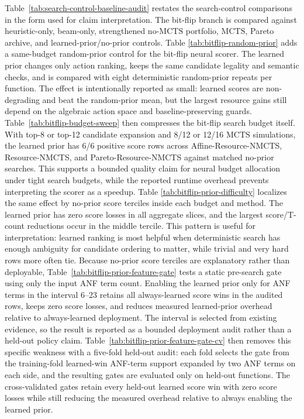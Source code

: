 \documentclass[11pt]{article}
\newcommand{\method}{Resource-NMCTS}
\newcommand{\mcts}{\ensuremath{\mathrm{MCTS}}}
\begin{document}
Table~\ref{tab:search-control-baseline-audit} restates the search-control
comparisons in the form used for claim interpretation.  The bit-flip branch is
compared against heuristic-only, beam-only, strengthened no-\mcts{} portfolio,
\mcts{}, Pareto archive, and learned-prior/no-prior controls.  Table
\ref{tab:bitflip-random-prior} adds a same-budget random-prior control for the
bit-flip neural scorer.  The learned prior changes only action ranking, keeps
the same candidate legality and semantic checks, and is compared with eight
deterministic random-prior repeats per function.  The effect is intentionally
reported as small: learned scores are non-degrading and beat the random-prior
mean, but the largest resource gains still depend on the algebraic action space
and baseline-preserving guards.  Table~\ref{tab:bitflip-budget-sweep} then
compresses the bit-flip search budget itself.  With top-8 or top-12 candidate
expansion and 8/12 or 12/16 \mcts{} simulations, the learned prior has 6/6
positive score rows across Affine-\method{}, \method{}, and Pareto-\method{}
against matched no-prior searches.  This supports a bounded quality claim for
neural budget allocation under tight search budgets, while the reported runtime
overhead prevents interpreting the scorer as a speedup.  Table
\ref{tab:bitflip-prior-difficulty} localizes the same effect by no-prior score
terciles inside each budget and method.  The learned prior has zero score
losses in all aggregate slices, and the largest score/T-count reductions occur
in the middle tercile.  This pattern is useful for interpretation: learned
ranking is most helpful when deterministic search has enough ambiguity for
candidate ordering to matter, while trivial and very hard rows more often tie.
Because no-prior score terciles are explanatory rather than deployable,
Table~\ref{tab:bitflip-prior-feature-gate} tests a static pre-search gate using
only the input ANF term count.  Enabling the learned prior only for ANF terms in
the interval 6--23 retains all always-learned score wins in the audited rows,
keeps zero score losses, and reduces measured learned-prior overhead relative
to always-learned deployment.  The interval is selected from existing evidence,
so the result is reported as a bounded deployment audit rather than a held-out
policy claim.  Table~\ref{tab:bitflip-prior-feature-gate-cv} then removes this
specific weakness with a five-fold held-out audit: each fold selects the gate
from the training-fold learned-win ANF-term support expanded by two ANF terms on
each side, and the resulting gates are evaluated only on held-out functions.
The cross-validated gates retain every held-out learned score win with zero
score losses while still reducing the measured overhead relative to always
enabling the learned prior.
\end{document}
